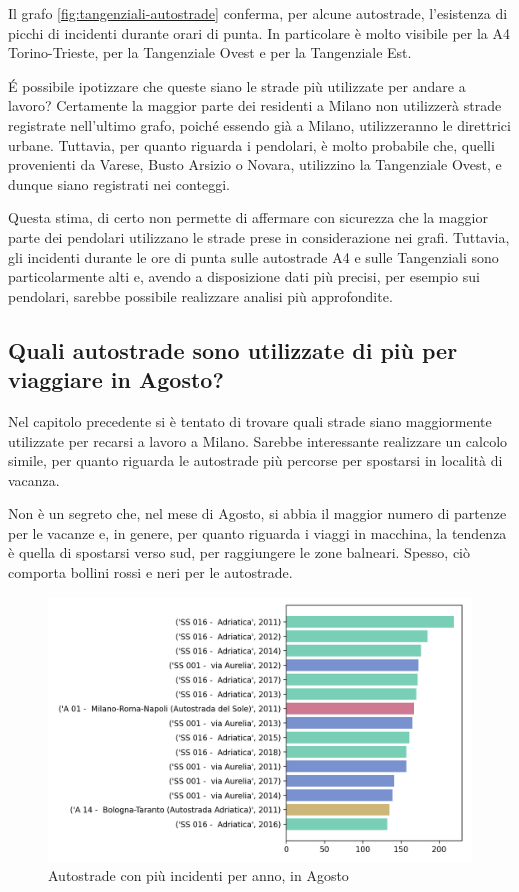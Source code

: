\documentclass[a4paper,12pt]{report}
\begin{document}
Il grafo \ref{fig:tangenziali-autostrade} conferma, per alcune autostrade, 
l'esistenza di picchi di incidenti durante orari di punta. 
In particolare è molto visibile per la A4 Torino-Trieste, 
per la Tangenziale Ovest e per la Tangenziale Est.

\'E possibile ipotizzare che queste siano le strade più utilizzate per 
andare a lavoro? 
Certamente la maggior parte dei residenti a Milano non utilizzerà strade registrate 
nell'ultimo grafo, poiché essendo già a Milano, utilizzeranno le direttrici urbane. 
Tuttavia, per quanto riguarda i pendolari, è molto probabile che, quelli provenienti 
da Varese, Busto Arsizio o Novara, utilizzino la Tangenziale Ovest, 
e dunque siano registrati nei conteggi. 

Questa stima, di certo non permette di affermare con sicurezza 
che la maggior parte dei pendolari utilizzano le strade prese in considerazione 
nei grafi.
Tuttavia, gli incidenti durante le ore di punta sulle autostrade A4 e sulle 
Tangenziali sono particolarmente alti e, avendo a disposizione dati più 
precisi, per esempio sui pendolari, sarebbe possibile realizzare analisi 
più approfondite.

\subsection{Quali autostrade sono utilizzate di più per viaggiare in Agosto?}

Nel capitolo precedente si è tentato di trovare quali strade siano maggiormente 
utilizzate per recarsi a lavoro a Milano. 
Sarebbe interessante realizzare un calcolo simile, per quanto riguarda le autostrade 
più percorse per spostarsi in località di vacanza. 

Non è un segreto che, nel mese di Agosto, si abbia il maggior numero di 
partenze per le vacanze e, in genere, per quanto riguarda i viaggi 
in macchina, la tendenza è quella di spostarsi verso sud, 
per raggiungere le zone balneari.
Spesso, ciò comporta bollini rossi e neri per le autostrade. 

\begin{figure}
    \includegraphics[width=\linewidth]{../src/incidenti/incidenti_aci/agosto/autostrade_anno_agosto.png}
    \caption{Autostrade con più incidenti per anno, in Agosto}
    \label{fig:autostrade-anno-agosto}
\end{figure}
\end{document}
